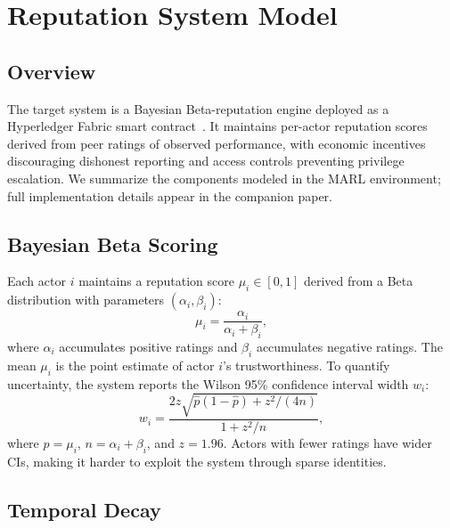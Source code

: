 \section{Reputation System Model}
\label{sec:sysmodel}

\subsection{Overview}

The target system is a Bayesian Beta-reputation engine deployed as a
Hyperledger Fabric smart contract~\cite{almaayn2024unified}.  It maintains
per-actor reputation scores derived from peer ratings of observed
performance, with economic incentives discouraging dishonest reporting and
access controls preventing privilege escalation.  We summarize the
components modeled in the MARL environment; full implementation details
appear in the companion paper.

\subsection{Bayesian Beta Scoring}

Each actor $i$ maintains a reputation score $\mu_i \in [0,1]$ derived from
a Beta distribution with parameters $(\alpha_i, \beta_i)$:
\begin{equation}
  \mu_i = \frac{\alpha_i}{\alpha_i + \beta_i},
  \label{eq:beta_mean}
\end{equation}
where $\alpha_i$ accumulates positive ratings and $\beta_i$ accumulates
negative ratings.  The mean $\mu_i$ is the point estimate of actor $i$'s
trustworthiness.  To quantify uncertainty, the system reports the Wilson
95\% confidence interval width $w_i$:
\begin{equation}
  w_i = \frac{2z\sqrt{\hat{p}(1-\hat{p}) + z^2/(4n)}}{1 + z^2/n},
  \label{eq:wilson_ci}
\end{equation}
where $\hat{p} = \mu_i$, $n = \alpha_i + \beta_i$, and $z = 1.96$.  Actors
with fewer ratings have wider CIs, making it harder to exploit the system
through sparse identities.

\subsection{Temporal Decay}

